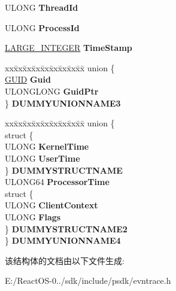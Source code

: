 \begin{DoxyCompactItemize}
\begin{tabbing}
\end{tabbing}\item 
\mbox{\label{struct___e_v_e_n_t___t_r_a_c_e___h_e_a_d_e_r_abc65e3d70ce78549dc200bcbf7a4e0db}} 
U\+L\+O\+NG {\bfseries Thread\+Id}
\item 
\mbox{\label{struct___e_v_e_n_t___t_r_a_c_e___h_e_a_d_e_r_a58265c3b58bd02fd8eb22682c86fda2a}} 
U\+L\+O\+NG {\bfseries Process\+Id}
\item 
\mbox{\label{struct___e_v_e_n_t___t_r_a_c_e___h_e_a_d_e_r_a72896710510cd098b74d380d6cb24783}} 
\hyperlink{union___l_a_r_g_e___i_n_t_e_g_e_r}{L\+A\+R\+G\+E\+\_\+\+I\+N\+T\+E\+G\+ER} {\bfseries Time\+Stamp}
\item 
\mbox{\label{struct___e_v_e_n_t___t_r_a_c_e___h_e_a_d_e_r_afba22ee748b996139f6be1399060b0b1}} 
\begin{tabbing}
xx\=xx\=xx\=xx\=xx\=xx\=xx\=xx\=xx\=\kill
union \{\\
\>\hyperlink{interface_g_u_i_d}{GUID} {\bfseries Guid}\\
\>ULONGLONG {\bfseries GuidPtr}\\
\} {\bfseries DUMMYUNIONNAME3}\\

\end{tabbing}\item 
\mbox{\label{struct___e_v_e_n_t___t_r_a_c_e___h_e_a_d_e_r_a324a9146bafd8bf0eebb7efeff68dfbc}} 
\begin{tabbing}
xx\=xx\=xx\=xx\=xx\=xx\=xx\=xx\=xx\=\kill
union \{\\
\>struct \{\\
\>\>ULONG {\bfseries KernelTime}\\
\>\>ULONG {\bfseries UserTime}\\
\>\} {\bfseries DUMMYSTRUCTNAME}\\
\>ULONG64 {\bfseries ProcessorTime}\\
\>struct \{\\
\>\>ULONG {\bfseries ClientContext}\\
\>\>ULONG {\bfseries Flags}\\
\>\} {\bfseries DUMMYSTRUCTNAME2}\\
\} {\bfseries DUMMYUNIONNAME4}\\

\end{tabbing}\end{DoxyCompactItemize}


该结构体的文档由以下文件生成\+:\begin{DoxyCompactItemize}
\item 
E\+:/\+React\+O\+S-\/0../sdk/include/psdk/evntrace.\+h\end{DoxyCompactItemize}
